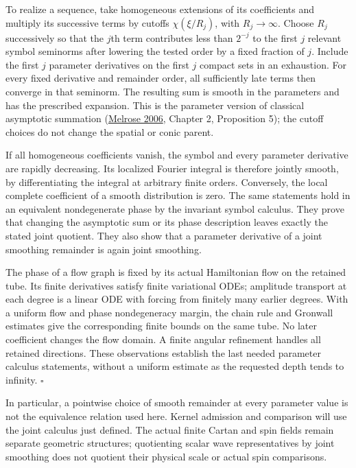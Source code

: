 \documentclass[
  english,
  11pt,
  reqno]{amsart}
\begin{document}
To realize a sequence, take homogeneous extensions of its coefficients
and multiply its successive terms by cutoffs \(\chi(\xi/R_j)\), with
\(R_j\to\infty\). Choose \(R_j\) successively so that the \(j\)th term
contributes less than \(2^{-j}\) to the first \(j\) relevant symbol
seminorms after lowering the tested order by a fixed fraction of \(j\).
Include the first \(j\) parameter derivatives on the first \(j\) compact
sets in an exhaustion. For every fixed derivative and remainder order,
all sufficiently late terms then converge in that seminorm. The
resulting sum is smooth in the parameters and has the prescribed
expansion. This is the parameter version of classical asymptotic
summation (\hyperref[ref-Melrose2006]{Melrose 2006}, Chapter 2,
Proposition 5); the cutoff choices do not change the spatial or conic
parent.

If all homogeneous coefficients vanish, the symbol and every parameter
derivative are rapidly decreasing. Its localized Fourier integral is
therefore jointly smooth, by differentiating the integral at arbitrary
finite orders. Conversely, the local complete coefficient of a smooth
distribution is zero. The same statements hold in an equivalent
nondegenerate phase by the invariant symbol calculus. They prove that
changing the asymptotic sum or its phase description leaves exactly the
stated joint quotient. They also show that a parameter derivative of a
joint smoothing remainder is again joint smoothing.

The phase of a flow graph is fixed by its actual Hamiltonian flow on the
retained tube. Its finite derivatives satisfy finite variational ODEs;
amplitude transport at each degree is a linear ODE with forcing from
finitely many earlier degrees. With a uniform flow and phase
nondegeneracy margin, the chain rule and Gronwall estimates give the
corresponding finite bounds on the same tube. No later coefficient
changes the flow domain. A finite angular refinement handles all
retained directions. These observations establish the last needed
parameter calculus statements, without a uniform estimate as the
requested depth tends to infinity. \hfill\(\square\)

In particular, a pointwise choice of smooth remainder at every parameter
value is not the equivalence relation used here. Kernel admission and
comparison will use the joint calculus just defined. The actual finite
Cartan and spin fields remain separate geometric structures; quotienting
scalar wave representatives by joint smoothing does not quotient their
physical scale or actual spin comparisons.
\end{document}
